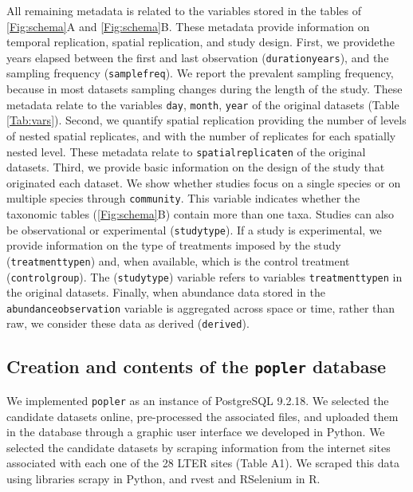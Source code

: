 \documentclass{article}\usepackage[]{graphicx}\usepackage[]{color}
\begin{document}
All remaining metadata is related to the variables stored in the tables of \ref{Fig:schema}A and \ref{Fig:schema}B. These metadata provide information on temporal replication, spatial replication, and study design. First, we providethe years elapsed between the first and last observation (\texttt{duration\textunderscore years}), and the sampling frequency (\texttt{samplefreq}). We report the prevalent sampling frequency, because in most datasets sampling changes during the length of the study. These metadata relate to the variables \texttt{day}, \texttt{month}, \texttt{year} of the original datasets (Table \ref{Tab:vars}). Second, we quantify spatial replication providing the number of levels of nested spatial replicates, and with the number of replicates for each spatially nested level. These metadata relate to \texttt{spatial\textunderscore replicate\textunderscore n} of the original datasets. Third, we provide basic information on the design of the study that originated each dataset. We show whether studies focus on a single species or on multiple species through \texttt{community}. This variable indicates whether the taxonomic tables (\ref{Fig:schema}B) contain more than one taxa. Studies can also be observational or experimental (\texttt{studytype}). If a study is experimental, we provide information on the type of treatments imposed by the study (\texttt{treatment\textunderscore type\textunderscore n}) and, when available, which is the control treatment (\texttt{control\textunderscore group}). The (\texttt{studytype}) variable refers to variables \texttt{treatment\textunderscore type\textunderscore n} in the original datasets. Finally, when abundance data stored in the \texttt{abundance\textunderscore observation} variable is aggregated across space or time, rather than raw, we consider these data as derived (\texttt{derived}).

\subsection*{Creation and contents of the \texttt{popler} database}
We implemented \texttt{popler} as an instance of PostgreSQL 9.2.18. We selected the candidate datasets online, pre-processed the associated files, and uploaded them in the database through a graphic user interface we developed in Python. We selected the candidate datasets by scraping information from the internet sites associated with each one of the 28 LTER sites (Table A1). We scraped this data using libraries scrapy in Python, and rvest and RSelenium in R.
\end{document}

